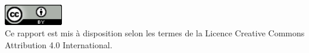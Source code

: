 \newpage
\thispagestyle{empty}
\null
\vspace{\fill}
\begin{center}
    \includegraphics[width=1in]{./license.png} \\
    Ce rapport est mis à disposition selon les termes de la Licence Creative
    Commons Attribution 4.0 International.
\end{center}
